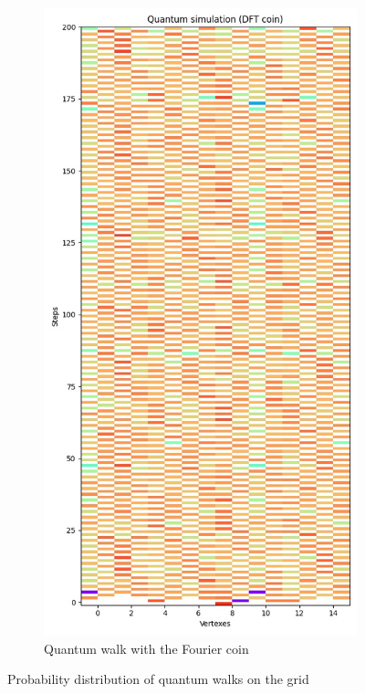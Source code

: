 \begin{figure}[H]
\begin{subfigure}{.45\linewidth}
  \end{subfigure}
  \begin{subfigure}{.45\linewidth}
    \centering
    \includegraphics[width=\linewidth]{./figures/results/grid/dft.jpg}
    \caption{Quantum walk with the Fourier coin}
  \end{subfigure}
  \caption{Probability distribution of quantum walks on the grid}
\end{figure}

